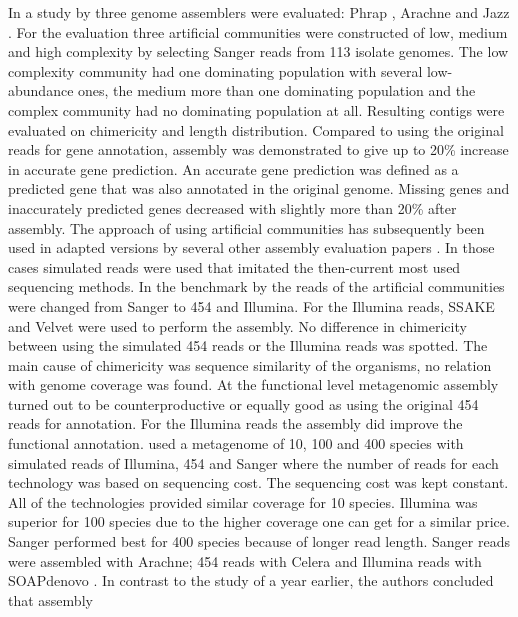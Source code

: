 \documentclass[a4paper,12pt]{report}
\begin{document}
In a study by \citet{Mavromatis17468765} three genome assemblers were
evaluated: Phrap \cite{delaBastide18428783}, Arachne \cite{Batzoglou11779843}
and Jazz \cite{Aparicio12142439}. For the evaluation three artificial
communities were constructed of low, medium and high complexity by selecting
Sanger reads from 113 isolate genomes. The low complexity community had one
dominating population with several low-abundance ones, the medium more than one
dominating population and the complex community had no dominating population at
all. Resulting contigs were evaluated on chimericity and length distribution.
Compared to using the original reads for gene annotation, assembly was
demonstrated to give up to 20\% increase in accurate gene prediction. An
accurate gene prediction was defined as a predicted gene that was also
annotated in the original genome. Missing genes and inaccurately predicted
genes decreased with slightly more than 20\% after assembly. The approach of
using artificial communities has subsequently been used in adapted versions by
several other assembly evaluation papers
\cite{Pignatelli21625384,Mende22384016}. In those cases simulated reads were
used that imitated the then-current most used sequencing methods. In the
benchmark by \citet{Pignatelli21625384} the reads of the artificial communities
were changed from Sanger to 454 and Illumina. For the Illumina reads, SSAKE
\cite{Warren17158514} and Velvet were used to perform the assembly. No
difference in chimericity between using the simulated 454 reads or the Illumina
reads was spotted. The main cause of chimericity was sequence similarity of the
organisms, no relation with genome coverage was found. At the functional level
metagenomic assembly turned out to be counterproductive or equally good as using the
original 454 reads for annotation. For the Illumina reads the assembly did
improve the functional annotation. \citet{Mende22384016} used a metagenome of
10, 100 and 400 species with simulated reads of Illumina, 454 and Sanger where
the number of reads for each technology was based on sequencing cost. The
sequencing cost was kept constant.  All of the technologies provided similar
coverage for 10 species. Illumina was superior for 100 species due to the
higher coverage one can get for a similar price.  Sanger performed best for 400
species because of longer read length.  Sanger reads were assembled with
Arachne; 454 reads with Celera \cite{Myers10731133} and Illumina reads with
SOAPdenovo \cite{Li20019144}. In contrast to the study of
\citet{Pignatelli21625384} a year earlier, the authors concluded that assembly
\end{document}
